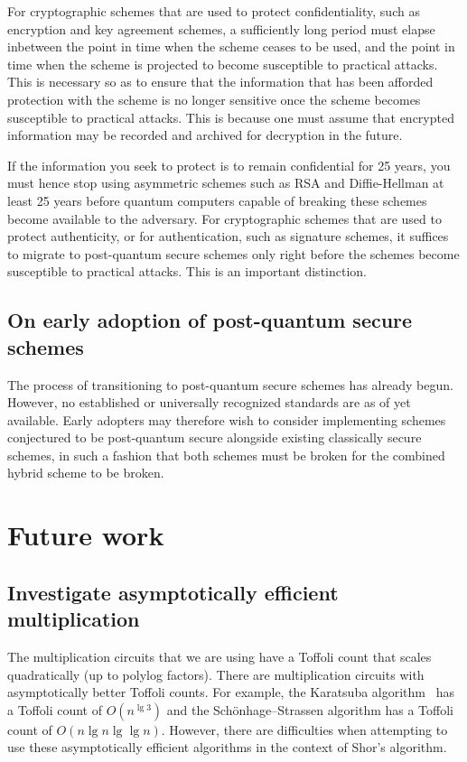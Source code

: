 \documentclass[a4paper, onecolumn, accepted=2021-03-29]{quantumarticle}
\begin{document}
For cryptographic schemes that are used to protect confidentiality, such as encryption and key agreement schemes, a sufficiently long period must elapse inbetween the point in time when the scheme ceases to be used, and the point in time when the scheme is projected to become susceptible to practical attacks. This is necessary so as to ensure that the information that has been afforded protection with the scheme is no longer sensitive once the scheme becomes susceptible to practical attacks. This is because one must assume that encrypted information may be recorded and archived for decryption in the future.

If the information you seek to protect is to remain confidential for 25 years, you must hence stop using asymmetric schemes such as RSA and Diffie-Hellman at least 25 years before quantum computers capable of breaking these schemes become available to the adversary. For cryptographic schemes that are used to protect authenticity, or for authentication, such as signature schemes, it suffices to migrate to post-quantum secure schemes only right before the schemes become susceptible to practical attacks. This is an important distinction.

\subsection{On early adoption of post-quantum secure schemes}
The process of transitioning to post-quantum secure schemes has already begun.
However, no established or universally recognized standards are as of yet available.
Early adopters may therefore wish to consider implementing schemes conjectured to be post-quantum secure  alongside existing classically secure schemes, in such a fashion that both schemes must be broken for the combined hybrid scheme to be broken.









\section{Future work}
\label{sec:future-work}

\subsection{Investigate asymptotically efficient multiplication}

The multiplication circuits that we are using have a Toffoli count that scales quadratically (up to polylog factors).
There are multiplication circuits with asymptotically better Toffoli counts.
For example, the Karatsuba algorithm~\cite{karatsuba1962multiplication} has a Toffoli count of $O(n^{\lg 3})$ and the Schönhage–Strassen algorithm \cite{schonhage1971multiply} has a Toffoli count of $O(n \lg n \lg \lg n)$.
However, there are difficulties when attempting to use these asymptotically efficient algorithms in the context of Shor's algorithm.
\end{document}
